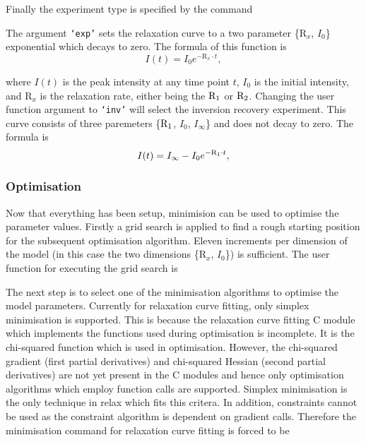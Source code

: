 
Finally the experiment type is specified by the command


The argument \texttt{`exp'} sets the relaxation curve to a two parameter \{$\mathrm{R}_x$, $I_0$\} exponential which decays to zero.  The formula of this function is
\begin{equation}
 I(t) = I_0 e^{-\mathrm{R}_x \cdot t},
\end{equation}

\noindent where $I(t)$ is the peak intensity at any time point $t$, $I_0$ is the initial intensity, and $\mathrm{R}_x$ is the relaxation rate, either being the $\mathrm{R}_1$ or $\mathrm{R}_2$.  Changing the user function argument to \texttt{`inv'} will select the inversion recovery experiment.  This curve consists of three paremeters \{$\mathrm{R}_1$, $I_0$, $I_{\infty}$\} and does not decay to zero.  The formula is
\begin{equation}
 I(t) = I_{\infty} - I_0 e^{-\mathrm{R}_1 \cdot t},
\end{equation}


\subsubsection{Optimisation}

Now that everything has been setup, minimision can be used to optimise the parameter values.  Firstly a grid search is applied to find a rough starting position for the subsequent optimisation algorithm.  Eleven increments per dimension of the model (in this case the two dimensions \{$\mathrm{R}_x$, $I_0$\}) is sufficient.  The user function for executing the grid search is


The next step is to select one of the minimisation algorithms to optimise the model parameters.  Currently for relaxation curve fitting, only simplex minimisation is supported.  This is because the relaxation curve fitting C module which implements the functions used during optimisation is incomplete.  It is the chi-squared function which is used in optimisation.  However, the chi-squared gradient (first partial derivatives) and chi-squared Hessian (second partial derivatives) are not yet present in the C modules and hence only optimisation algorithms which employ function calls are supported.  Simplex minimisation is the only technique in relax which fits this critera.  In addition, constraints cannot be used as the constraint algorithm is dependent on gradient calls.  Therefore the minimisation command for relaxation curve fitting is forced to be

